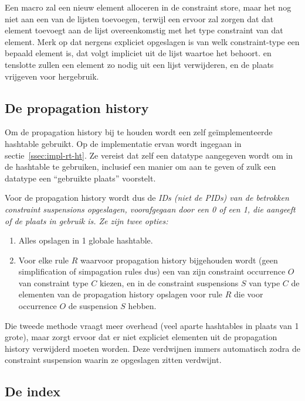 Een  macro zal een nieuw element alloceren in de constraint store, maar het nog niet aan een van de lijsten toevoegen, terwijl een  ervoor zal zorgen dat dat element toevoegt aan de lijst overeenkomstig met het type constraint van dat element. Merk op dat nergens expliciet opgeslagen is van welk constraint-type een bepaald element is, dat volgt impliciet uit de lijst waartoe het behoort.  en  tenslotte zullen een element zo nodig uit een lijst verwijderen, en de plaats vrijgeven voor hergebruik.

\subsection{De propagation history} \label{sec:prophist}


Om de propagation history bij te houden wordt een zelf ge\"implementeerde hashtable gebruikt. Op de implementatie ervan wordt ingegaan in sectie~\ref{ssec:impl-rt-ht}. Ze vereist dat zelf een datatype aangegeven wordt om in de hashtable te gebruiken, inclusief een manier om aan te geven of zulk een datatype een ``gebruikte plaats'' voorstelt.

Voor de propagation history wordt dus de \em{ID}s (niet de \em{PID}s) van de betrokken constraint suspensions opgeslagen, voorafgegaan door een 0 of een 1, die aangeeft of de plaats in gebruik is. Ze zijn twee opties: \begin{enumerate}
  \item Alles opslagen in 1 globale hashtable.
  \item Voor elke rule $R$ waarvoor propagation history bijgehouden wordt (geen simplification of simpagation rules dus) een van zijn constraint occurrence $O$ van constraint type $C$ kiezen, en in de constraint suspensions $S$ van type $C$ de elementen van de propagation history opslagen voor rule $R$ die voor occurrence $O$ de suspension $S$ hebben.
\end{enumerate}
Die tweede methode vraagt meer overhead (veel aparte hashtables in plaats van 1 grote), maar zorgt ervoor dat er niet expliciet elementen uit de propagation history verwijderd moeten worden. Deze verdwijnen immers automatisch zodra de constraint suspension waarin ze opgeslagen zitten verdwijnt.

\subsection{De index} \label{sec:index}

